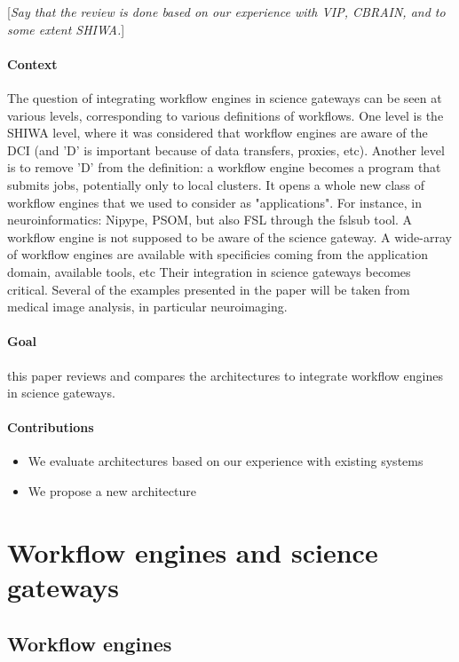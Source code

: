 \documentclass[preprint,3p,twocolumn]{elsarticle}
\newcommand{\todo}[1]{\color{blue}\xspace[\emph{#1}]\xspace\color{black}}
\begin{document}
\todo{Say that the review is done based on our experience with VIP,
  CBRAIN, and to some extent SHIWA.}

\paragraph{Context} The question of integrating workflow engines in
science gateways can be seen at various levels, corresponding to
various definitions of workflows. One level is the SHIWA level, where
it was considered that workflow engines are aware of the DCI (and 'D'
is important because of data transfers, proxies, etc). Another level
is to remove 'D' from the definition: a workflow engine becomes a
program that submits jobs, potentially only to local clusters. It
opens a whole new class of workflow engines that we used to consider
as "applications". For instance, in neuroinformatics: Nipype, PSOM,
but also FSL through the fslsub tool. A workflow engine is not
supposed to be aware of the science gateway.  A wide-array of workflow
engines are available with specificies coming from the application
domain, available tools, etc Their integration in science gateways
becomes critical. Several of the examples presented in the
paper will be taken from medical image analysis, in particular
neuroimaging.

\paragraph{Goal} this paper reviews and compares the architectures to
integrate workflow engines in science gateways.

\paragraph{Contributions}
\begin{itemize}
\item We evaluate architectures based on our experience with existing systems
\item We propose a new architecture
\end{itemize}

\section{Workflow engines and science gateways}

\subsection{Workflow engines}
\end{document}
